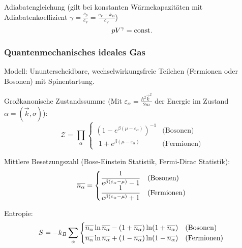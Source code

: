 			\noindent
			Adiabatengleichung \newline(gilt bei konstanten Wärmekapazitäten mit Adiabatenkoeffizient $\gamma = \frac{c_p}{c_V} = \frac{c_V + k_B}{c_V}$)
			\begin{equation}
				p V^\gamma = \mathrm{const.}
			\end{equation}

		\subsubsection{Quantenmechanisches ideales Gas}
			\noindent
			Modell: Ununterscheidbare, wechselwirkungsfreie Teilchen (Fermionen oder Bosonen) mit Spinentartung. \vsp

			\noindent
			Großkanonische Zustandssumme (Mit $\varepsilon_\alpha = \frac{\hbar^2 \vec{k}^2}{2m}$ der Energie im Zustand $\alpha=(\vec{k},\sigma)$):
			\begin{equation}
				\mathcal{Z} = \prod_{\alpha}
					\begin{cases}
						\left( 1-e^{\beta(\mu-\varepsilon_\alpha)}\right)^{-1} & \text{(Bosonen)} \\
						\phantom{\big(} 1+e^{\beta(\mu-\varepsilon_\alpha)} & \text{(Fermionen)}
					\end{cases}
			\end{equation}

			\noindent
			Mittlere Besetzungszahl (Bose-Einstein Statistik, Fermi-Dirac Statistik):
			\begin{equation}
				\overline{n_\alpha} =
					\begin{cases}
						\dfrac{1}{e^{\beta(\varepsilon_\alpha-\mu)} - 1} & \text{(Bosonen)} \\
						\dfrac{1}{e^{\beta(\varepsilon_\alpha-\mu)} + 1} & \text{(Fermionen)}
					\end{cases} \\
			\end{equation}

			\noindent
			Entropie:
			\begin{equation}
				S= -k_B\sum_\alpha
					\begin{cases}
						\overline{n_\alpha} \ln \overline{n_\alpha} - (1+\overline{n_\alpha}) \ln (1+\overline{n_\alpha}) & \text{(Bosonen)} \\
						\overline{n_\alpha} \ln \overline{n_\alpha} + (1-\overline{n_\alpha}) \ln (1-\overline{n_\alpha}) & \text{(Fermionen)}
					\end{cases} \\
			\end{equation}

